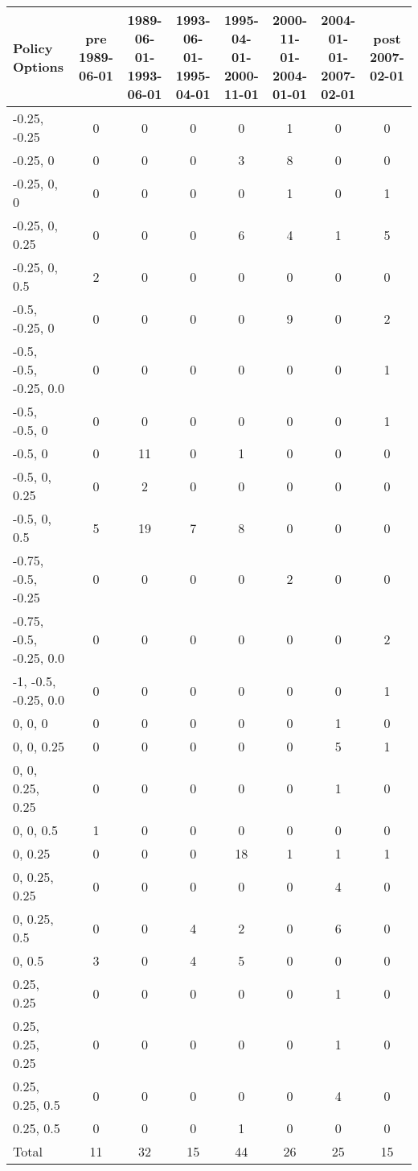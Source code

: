 \begin{tabular}{lccccccc}
\hline\hline 
\addlinespace 
Policy Options & pre 1989-06-01 & \shortstack{1989-06-01- \\ 1993-06-01} & \shortstack{1993-06-01- \\ 1995-04-01} & \shortstack{1995-04-01- \\ 2000-11-01} & \shortstack{2000-11-01- \\ 2004-01-01} & \shortstack{2004-01-01- \\ 2007-02-01} & post 2007-02-01 \\ 
\hline 
-0.25, -0.25 & 0 & 0 & 0 & 0 & 1 & 0 & 0 \\
-0.25, 0 & 0 & 0 & 0 & 3 & 8 & 0 & 0 \\
-0.25, 0, 0 & 0 & 0 & 0 & 0 & 1 & 0 & 1 \\
-0.25, 0, 0.25 & 0 & 0 & 0 & 6 & 4 & 1 & 5 \\
-0.25, 0, 0.5 & 2 & 0 & 0 & 0 & 0 & 0 & 0 \\
-0.5, -0.25, 0 & 0 & 0 & 0 & 0 & 9 & 0 & 2 \\
-0.5, -0.5, -0.25, 0.0 & 0 & 0 & 0 & 0 & 0 & 0 & 1 \\
-0.5, -0.5, 0 & 0 & 0 & 0 & 0 & 0 & 0 & 1 \\
-0.5, 0 & 0 & 11 & 0 & 1 & 0 & 0 & 0 \\
-0.5, 0, 0.25 & 0 & 2 & 0 & 0 & 0 & 0 & 0 \\
-0.5, 0, 0.5 & 5 & 19 & 7 & 8 & 0 & 0 & 0 \\
-0.75, -0.5, -0.25 & 0 & 0 & 0 & 0 & 2 & 0 & 0 \\
-0.75, -0.5, -0.25, 0.0 & 0 & 0 & 0 & 0 & 0 & 0 & 2 \\
-1, -0.5, -0.25, 0.0 & 0 & 0 & 0 & 0 & 0 & 0 & 1 \\
0, 0, 0 & 0 & 0 & 0 & 0 & 0 & 1 & 0 \\
0, 0, 0.25 & 0 & 0 & 0 & 0 & 0 & 5 & 1 \\
0, 0, 0.25, 0.25 & 0 & 0 & 0 & 0 & 0 & 1 & 0 \\
0, 0, 0.5 & 1 & 0 & 0 & 0 & 0 & 0 & 0 \\
0, 0.25 & 0 & 0 & 0 & 18 & 1 & 1 & 1 \\
0, 0.25, 0.25 & 0 & 0 & 0 & 0 & 0 & 4 & 0 \\
0, 0.25, 0.5 & 0 & 0 & 4 & 2 & 0 & 6 & 0 \\
0, 0.5 & 3 & 0 & 4 & 5 & 0 & 0 & 0 \\
0.25, 0.25 & 0 & 0 & 0 & 0 & 0 & 1 & 0 \\
0.25, 0.25, 0.25 & 0 & 0 & 0 & 0 & 0 & 1 & 0 \\
0.25, 0.25, 0.5 & 0 & 0 & 0 & 0 & 0 & 4 & 0 \\
0.25, 0.5 & 0 & 0 & 0 & 1 & 0 & 0 & 0 \\
\addlinespace 
Total & 11 & 32 & 15 & 44 & 26 & 25 & 15 \\
\hline 
\end{tabular}